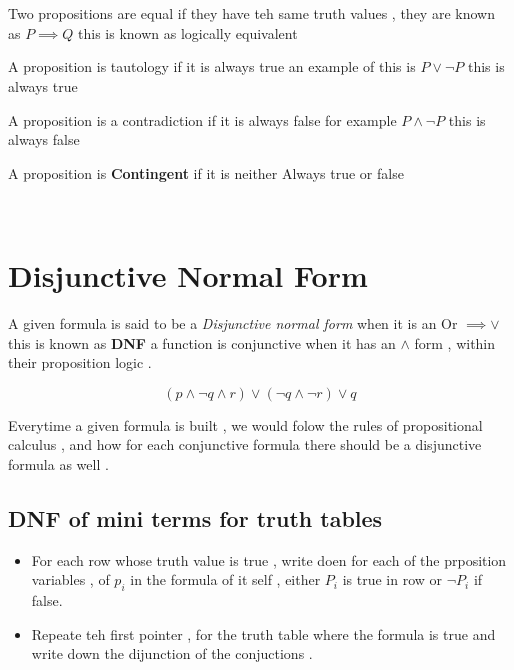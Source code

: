 \documentclass{article}
\theoremstyle{mytheoremstyle}
\theoremstyle{mytheoremstyle}
\theoremstyle{myproblemstyle}
\begin{document}
\\ \\


\begin{definition}
 Two propositions are equal if they have teh same truth values , they are known as $ P \implies Q$ this is known as logically equivalent
\end{definition}

\begin{definition}
A proposition is tautology if it is always true an example of this is $ P \lor \neg P$ this is always true

\end{definition}

\begin{definition}
A proposition is a contradiction if it is always false for example $ P \land \neg P $ this is always false
\end{definition}

\begin{definition}
A proposition is \textbf{Contingent} if it is neither Always true or false
\end{definition}

\\
\section{Disjunctive Normal Form}
A given formula is said to be a \textit{Disjunctive normal form} when it is an Or $\implies \lor$ this is known as \textbf{DNF} a function is conjunctive when it has an $ \land $ form , within their proposition logic .

\[(p \land \neg q \land r) \lor (\neg q \land \neg r) \lor q \]

Everytime a given formula is built , we would folow the rules of propositional calculus , and how for each conjunctive formula there should be a disjunctive formula as well .

\subsection{DNF of mini terms for truth tables}
\begin{itemize}
    \item For each row whose truth value is true , write doen for each of the prposition variables , of $ p_i $ in the formula of it self , either $P_i$ is true in row or $\neg P_i$ if false.
    \item Repeate teh first pointer , for the truth table where the formula is true and write down the dijunction of the conjuctions .
\end{itemize}
\end{document}
